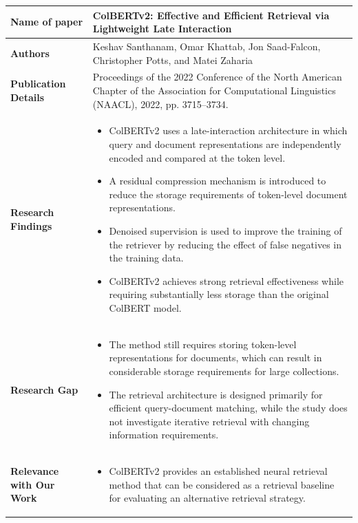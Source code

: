 \documentclass[12pt,a4paper]{report}
\begin{document}
\begin{longtable}{|p{1.25in}|p{5.15in}|}

\hline

\textbf{Name of paper} &
\textbf{ColBERTv2: Effective and Efficient Retrieval via Lightweight Late Interaction}
\\ \hline

\textbf{Authors} &
Keshav Santhanam, Omar Khattab, Jon Saad-Falcon, Christopher Potts, and Matei Zaharia
\\ \hline

\textbf{Publication Details} &
Proceedings of the 2022 Conference of the North American Chapter of the Association for Computational Linguistics (NAACL), 2022, pp. 3715--3734.
\\ \hline

\textbf{Research Findings} &
\begin{itemize}[
    leftmargin=0.18in,
    itemsep=0.05in,
    topsep=0pt,
    parsep=0pt
]
    \item ColBERTv2 uses a late-interaction architecture in which query and document representations are independently encoded and compared at the token level.

    \item A residual compression mechanism is introduced to reduce the storage requirements of token-level document representations.

    \item Denoised supervision is used to improve the training of the retriever by reducing the effect of false negatives in the training data.

    \item ColBERTv2 achieves strong retrieval effectiveness while requiring substantially less storage than the original ColBERT model.
\end{itemize}
\\ \hline

\textbf{Research Gap} &
\begin{itemize}[
    leftmargin=0.18in,
    itemsep=0.05in,
    topsep=0pt,
    parsep=0pt
]
    \item The method still requires storing token-level representations for documents, which can result in considerable storage requirements for large collections.

    \item The retrieval architecture is designed primarily for efficient query-document matching, while the study does not investigate iterative retrieval with changing information requirements.
\end{itemize}
\\ \hline

\textbf{Relevance with Our Work} &
\begin{itemize}[
    leftmargin=0.18in,
    itemsep=0.05in,
    topsep=0pt,
    parsep=0pt
]
    \item ColBERTv2 provides an established neural retrieval method that can be considered as a retrieval baseline for evaluating an alternative retrieval strategy.
\end{itemize}
\\ \hline

\end{longtable}
\end{document}

